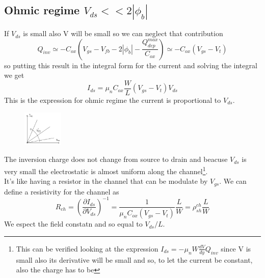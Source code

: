 \subsection{Ohmic regime $V_{ds}<<2|\phi_b|$}

If $V_{ds}$ is small also V will be small so we can neglect that contribution 
\begin{equation}
Q_{inv}\simeq -C_{ox}(V_{gs}-V_{fb}-2|\phi_b|-\frac{Q_{dep}^{max}}{C_{ox}})\simeq -C_{ox}(V_{gs}-V_t)
\end{equation}
so putting this result in the integral form for the current and solving the integral we get
\begin{equation}
I_{ds}=\mu_nC_{ox}\frac{W}{L}(V_{gs}-V_t)V_{ds}
\end{equation}
This is the expression for ohmic regime the current is proportional to $V_{ds}$.\\
\begin{figure}
\includegraphics[width=0.17\textwidth]{ohmreg.png}
\end{figure}

The inversion charge does not change from source to drain and beacuse $V_{ds}$ is very small the electrostatic is almost uniform along the channel\footnote{This can be verified looking at the expression $I_{ds}=-\mu_nW \frac{dV}{dy}Q_{inv}$ since V is small also its derivative will be small and so, to let the current be constant, also the charge has to be}.\\

It's like having a resistor in the channel that can be modulate by $V_{gs}$. We can define a resistivity for the channel as 
\begin{equation}
R_{ch}=(\frac{\partial I_{ds}}{\partial V_{ds}})^{-1}=\frac{1}{\mu_nC_{ox}(V_{gs}-V_{t})}\frac{L}{W}=\rho_{sh}^{ch}\frac{L}{W}
\end{equation}
We espect the field constatn and so equal to $V_{ds}/L$.\\


